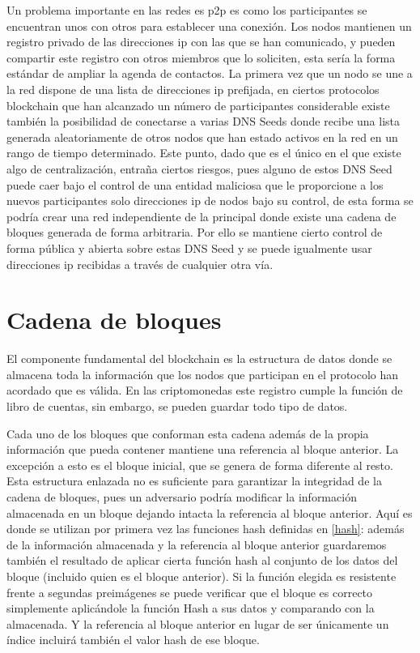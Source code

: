 Un problema importante en las redes es p2p es como los participantes se encuentran unos con otros para establecer una conexión. Los nodos mantienen un registro privado de las direcciones ip con las que se han comunicado, y pueden compartir este registro con otros miembros que lo soliciten, esta sería la forma estándar de ampliar la agenda de contactos. La primera vez que un nodo se une a la red dispone de una lista de direcciones ip prefijada, en ciertos protocolos blockchain que han alcanzado un número de participantes considerable existe también la posibilidad de conectarse a varias DNS Seeds donde recibe una lista generada aleatoriamente de otros nodos que han estado activos en la red en un rango de tiempo determinado. Este punto, dado que es el único en el que existe algo de centralización, entraña ciertos riesgos, pues alguno de estos DNS Seed puede caer bajo el control de una entidad maliciosa que le proporcione a los nuevos participantes solo direcciones ip de nodos bajo su control, de esta forma se podría crear una red independiente de la principal donde existe una cadena de bloques generada de forma arbitraria. Por ello se mantiene cierto control de forma pública y abierta sobre estas DNS Seed y se puede igualmente usar direcciones ip  recibidas a través de cualquier otra vía.

\section{Cadena de bloques}\label{bloques}
El componente fundamental del blockchain es la estructura de datos donde se almacena toda la información que los nodos que participan en el protocolo han acordado que es válida. En las criptomonedas este registro cumple la función de libro de cuentas, sin embargo, se pueden guardar todo tipo de datos.

Cada uno de los bloques que conforman esta cadena además de la propia información que pueda contener mantiene una referencia al bloque anterior. La excepción a esto es el bloque inicial, que se genera de forma diferente al resto.
Esta estructura enlazada no es suficiente para garantizar la integridad de la cadena de bloques, pues un adversario podría modificar la información almacenada en un bloque dejando intacta la referencia al bloque anterior. Aquí es donde se utilizan por primera vez las funciones hash definidas en \ref{hash}: además de la información almacenada y la referencia al bloque anterior guardaremos también el resultado de aplicar cierta función hash al conjunto de los datos del bloque (incluido quien es el bloque anterior). Si la función elegida es resistente frente a segundas preimágenes se puede verificar que  el bloque es correcto simplemente aplicándole la función Hash a sus datos y comparando con la almacenada. Y la referencia al bloque anterior en lugar de ser únicamente un índice incluirá también el valor hash de ese bloque.

